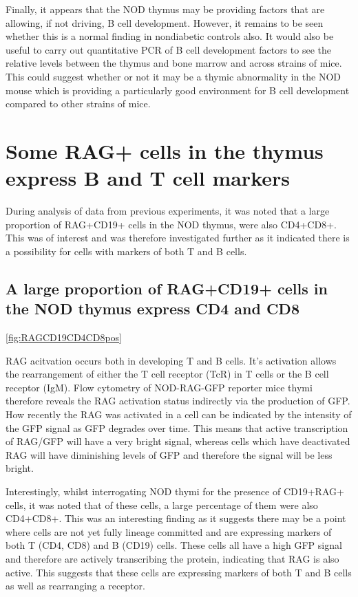 Finally, it appears that the NOD thymus may be providing factors that are allowing, if not driving, B cell development.
However, it remains to be seen whether this is a normal finding in nondiabetic controls also.
It would also be useful to carry out quantitative PCR of B cell development factors to see the relative levels between the thymus and bone marrow and across strains of mice.
This could suggest whether or not it may be a thymic abnormality in the NOD mouse which is providing a particularly good environment for B cell development compared to other strains of mice.

\section{Some RAG+ cells in the thymus express B and T cell markers}
During analysis of data from previous experiments, it was noted that a large proportion of RAG+CD19+ cells in the NOD thymus, were also CD4+CD8+.
This was of interest and was therefore investigated further as it indicated there is a possibility for cells with markers of both T and B cells.

\subsection{A large proportion of RAG+CD19+ cells in the NOD thymus express CD4 and CD8}

\cref{fig:RAGCD19CD4CD8pos}

RAG acitvation occurs both in developing T and B cells.
It's activation allows the rearrangement of either the T cell receptor (TcR) in T cells or the B cell receptor (IgM).
Flow cytometry of NOD-RAG-GFP reporter mice thymi therefore reveals the RAG activation status indirectly via the production of GFP.
How recently the RAG was activated in a cell can be indicated by the intensity of the GFP signal as GFP degrades over time.
This means that active transcription of RAG/GFP will have a very bright signal, whereas cells which have deactivated RAG will have diminishing levels of GFP and therefore the signal will be less bright.

Interestingly, whilst interrogating NOD thymi for the presence of CD19+RAG+ cells, it was noted that of these cells, a large percentage of them were also CD4+CD8+.
This was an interesting finding as it suggests there may be a point where cells are not yet fully lineage committed and are expressing markers of both T (CD4, CD8) and B (CD19) cells.
These cells all have a high GFP signal and therefore are actively transcribing the protein, indicating that RAG is also active.
This suggests that these cells are expressing markers of both T and B cells as well as rearranging a receptor.

